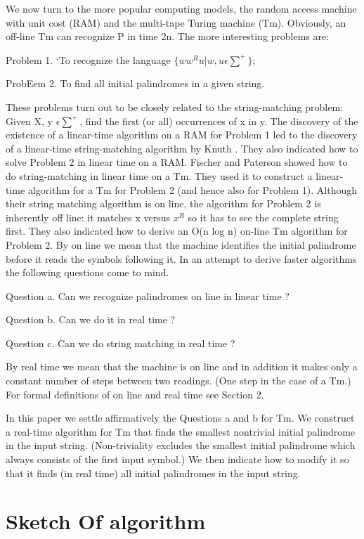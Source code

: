 \documentclass[11pt,a4paper]{report}
\begin{document}
We now turn to the more popular computing models, the random access machine
with unit cost (RAM) and the multi-tape Turing machine (Tm). Obviously, an off-line
Tm can recognize P in time 2n. The more interesting problems are:

Problem 1. ‘To recognize the language $\{ww^{R}u | w, u \epsilon \sum^{+}\}$;

ProbEem 2. To find all initial palindromes in a given string.

These problems turn out to be closely related to the string-matching problem: Given X,
y $ \epsilon \sum^{+}$, find the first (or all) occurrences of x in y. The discovery of the existence of a
linear-time algorithm on a RAM for Problem 1 led to the discovery of a linear-time
string-matching algorithm by Knuth \cite{knuth}. They also indicated how to solve
Problem 2 in linear time on a RAM. \cite{fischer} Fischer and Paterson showed how
to do string-matching in linear time on a Tm. They used it to construct a linear-time
algorithm for a Tm for Problem 2 (and hence also for Problem 1). Although their string matching algorithm is on line, the algorithm for Problem 2 is inherently off line: it
matches x versus $x^R$ so it has to see the complete string first. They also indicated how to
derive an O(n log n) on-line Tm algorithm for Problem 2. By on line we mean that the
machine identifies the initial palindrome before it reads the symbols following it. In an
attempt to derive faster algorithms the following questions come to mind.

Question a. Can we recognize palindromes on line in linear time ?

Question b. Can we do it in real time ?

Question c. Can we do string matching in real time ? 

By real time we mean that the machine is on line and in addition it makes only a
constant number of steps between two readings. (One step in the case of a Tm.) For
formal definitions of on line and real time see Section 2.

In this paper we settle affirmatively the Questions a and b for Tm.
We construct a real-time algorithm for Tm that finds the smallest nontrivial initial
palindrome in the input string. (Non-triviality excludes the smallest initial palindrome
which always consists of the first input symbol.) We then indicate how to modify it so
that it finds (in real time) all initial palindromes in the input string.


\chapter{Sketch Of algorithm}
\end{document}
